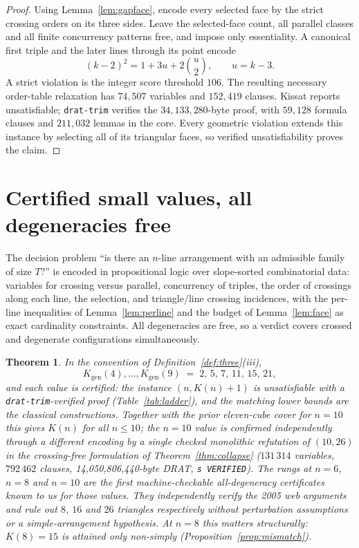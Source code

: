 \documentclass[11pt]{article}
\newtheorem{theorem}{Theorem}
\theoremstyle{definition}
\newcommand{\Kgen}{K_{\mathrm{gen}}}
\begin{document}
\begin{proof}
Using Lemma~\ref{lem:gapface}, encode every selected face by the strict
crossing orders on its three sides. Leave the selected-face count,
all parallel classes and all finite concurrency patterns free, and impose
only essentiality. A canonical first triple and the later lines through its
point encode
\[
 (k-2)^2=1+3u+2\binom u2,\qquad u=k-3.
\]
A strict violation is the integer score threshold $106$. The resulting
necessary order-table relaxation has $74{,}507$ variables and $152{,}419$
clauses. Kissat reports unsatisfiable; \texttt{drat-trim} verifies the
$34{,}133{,}280$-byte proof, with $59{,}128$ formula clauses and $211{,}032$
lemmas in the core. Every geometric violation extends this instance by
selecting all of its triangular faces, so verified unsatisfiability proves
the claim.
\end{proof}


\section{Certified small values, all degeneracies free}\label{sec:ladder}

The decision problem ``is there an $n$-line arrangement with an admissible
family of size $T$?'' is encoded in propositional logic over slope-sorted
combinatorial data: variables for crossing versus parallel, concurrency of
triples, the order of crossings along each line, the selection, and
triangle/line crossing incidences, with the per-line inequalities of
Lemma~\ref{lem:perline} and the budget of Lemma~\ref{lem:face} as exact
cardinality constraints. All degeneracies are free, so a verdict covers
crossed and degenerate configurations simultaneously.

\begin{theorem}\label{thm:ladder}
In the convention of Definition~\ref{def:three}(iii),
\[
 \Kgen(4),\dots,\Kgen(9)\;=\;2,\,5,\,7,\,11,\,15,\,21,
\]
and each value is certified: the instance $(n,K(n)+1)$ is unsatisfiable with
a \texttt{drat-trim}-verified proof (Table~\ref{tab:ladder}), and the
matching lower bounds are the classical constructions. Together with the
prior eleven-cube cover for $n=10$ this gives $K(n)$ for all $n\le10$; the
$n=10$ value is confirmed independently through a different encoding by a
single checked monolithic refutation of $(10,26)$ in the crossing-free
formulation of Theorem~\ref{thm:collapse} ($131\,314$ variables, $792\,462$
clauses, 14,050,806,440-byte DRAT, \texttt{s VERIFIED}).
The rungs at $n=6$, $n=8$ and $n=10$ are the first machine-checkable
all-degeneracy certificates known to us for those values. They independently
verify the 2005 web arguments \cite{Rasukaru2005} and rule out $8$, $16$ and
$26$ triangles respectively without perturbation assumptions or a
simple-arrangement hypothesis. At $n=8$ this matters structurally:
$K(8)=15$ is attained only non-simply (Proposition~\ref{prop:mismatch}).
\end{theorem}
\end{document}
